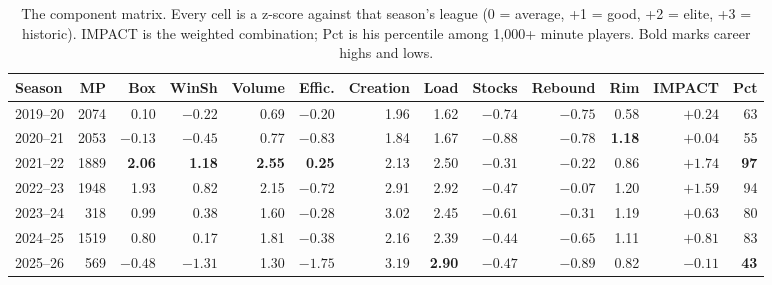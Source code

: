\documentclass[11pt]{article}
\begin{document}
\begin{table}[h]
\centering\small
\caption{The component matrix. Every cell is a z-score against that season's league
(0 = average, +1 = good, +2 = elite, +3 = historic). IMPACT is the weighted combination;
Pct is his percentile among 1{,}000+ minute players. Bold marks career highs and lows.}
\setlength{\tabcolsep}{4.5pt}
\begin{tabular}{lrrrrrrrrrrrr}
\toprule
Season & MP & Box & WinSh & Volume & Effic. & Creation & Load & Stocks & Rebound
& Rim & \textbf{IMPACT} & Pct \\
\midrule
2019--20 & 2074 & 0.10 & $-0.22$ & 0.69 & $-0.20$ & 1.96 & 1.62 & $-0.74$ & $-0.75$ & 0.58 & $+0.24$ & 63 \\
2020--21 & 2053 & $-0.13$ & $-0.45$ & 0.77 & $-0.83$ & 1.84 & 1.67 & $-0.88$ & $-0.78$ & \textbf{1.18} & $+0.04$ & 55 \\
2021--22 & 1889 & \textbf{2.06} & \textbf{1.18} & \textbf{2.55} & \textbf{0.25} & 2.13 & 2.50 & $-0.31$ & $-0.22$ & 0.86 & $\mathbf{+1.74}$ & \textbf{97} \\
2022--23 & 1948 & 1.93 & 0.82 & 2.15 & $-0.72$ & 2.91 & 2.92 & $-0.47$ & $-0.07$ & 1.20 & $+1.59$ & 94 \\
2023--24 & 318 & 0.99 & 0.38 & 1.60 & $-0.28$ & 3.02 & 2.45 & $-0.61$ & $-0.31$ & 1.19 & $+0.63$ & 80 \\
2024--25 & 1519 & 0.80 & 0.17 & 1.81 & $-0.38$ & 2.16 & 2.39 & $-0.44$ & $-0.65$ & 1.11 & $+0.81$ & 83 \\
2025--26 & 569 & $-0.48$ & $\mathbf{-1.31}$ & 1.30 & $\mathbf{-1.75}$ & $\mathbf{3.19}$ & \textbf{2.90} & $-0.47$ & $\mathbf{-0.89}$ & 0.82 & $\mathbf{-0.11}$ & \textbf{43} \\
\bottomrule
\end{tabular}
\label{tab:zmatrix}
\end{table}
\end{document}
